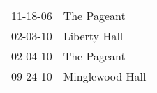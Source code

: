 \begin{supertabular}{p{0.07\textwidth}p{0.23\textwidth}}
 11-18-06 &      The Pageant \\
 02-03-10 &     Liberty Hall \\
 02-04-10 &      The Pageant \\
 09-24-10 &  Minglewood Hall \\
\end{supertabular}

